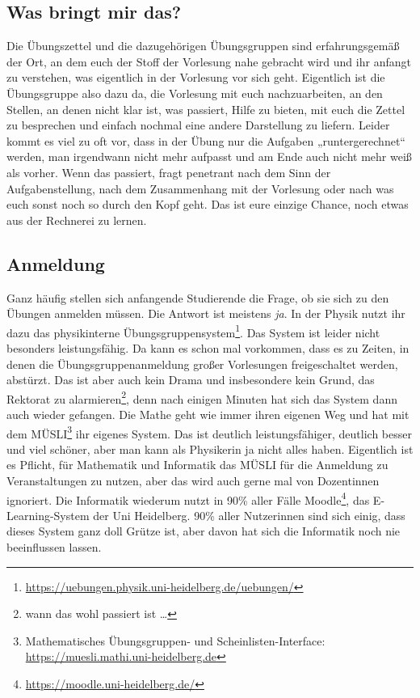 \subsection{Was bringt mir das?}
Die Übungszettel und die dazugehörigen Übungsgruppen sind erfahrungsgemäß der Ort, an dem euch der Stoff der Vorlesung nahe gebracht wird und ihr anfangt zu verstehen, was eigentlich in der Vorlesung vor sich geht. Eigentlich ist die Übungsgruppe also dazu da, die Vorlesung mit euch nachzuarbeiten, an den Stellen, an denen nicht klar ist, was passiert, Hilfe zu bieten, mit euch die Zettel zu besprechen und einfach nochmal eine andere Darstellung zu liefern. Leider kommt es viel zu oft vor, dass in der Übung nur die Aufgaben „runtergerechnet“ werden, man irgendwann nicht mehr aufpasst und am Ende auch nicht mehr weiß als vorher. Wenn das passiert, fragt penetrant nach dem Sinn der Aufgabenstellung, nach dem Zusammenhang mit der Vorlesung oder nach was euch sonst noch so durch den Kopf geht. Das ist eure einzige Chance, noch etwas aus der Rechnerei zu lernen.

\subsection{Anmeldung}
Ganz häufig stellen sich anfangende Studierende die Frage, ob sie sich zu den Übungen anmelden müssen. Die Antwort ist meistens \emph{ja}. In der Physik nutzt ihr dazu das physikinterne Übungsgruppensystem\footnote{\url{https://uebungen.physik.uni-heidelberg.de/uebungen/}}. Das System ist leider nicht besonders leistungsfähig. Da kann es schon mal vorkommen, dass es zu Zeiten, in denen die Übungsgruppenanmeldung großer Vorlesungen freigeschaltet werden, abstürzt. Das ist aber auch kein Drama und insbesondere kein Grund, das Rektorat zu alarmieren\footnote{wann das wohl passiert ist \dots}, denn nach einigen Minuten hat sich das System dann auch wieder gefangen. Die Mathe geht wie immer ihren eigenen Weg  und hat mit dem MÜSLI\footnote{Mathematisches Übungsgruppen- und Scheinlisten-Interface: \url{https://muesli.mathi.uni-heidelberg.de}} ihr eigenes System. Das ist deutlich leistungsfähiger, deutlich besser und viel schöner, aber man kann als Physikerin ja nicht alles haben. Eigentlich ist es Pflicht, für Mathematik und Informatik das MÜSLI für die Anmeldung zu Veranstaltungen zu nutzen, aber das wird auch gerne mal von Dozentinnen ignoriert. Die Informatik wiederum nutzt in 90\% aller Fälle Moodle\footnote{\url{https://moodle.uni-heidelberg.de/}}, das E-Learning-System der Uni Heidelberg. 90\% aller Nutzerinnen sind sich einig, dass dieses System ganz doll Grütze ist, aber davon hat sich die Informatik noch nie beeinflussen lassen.
